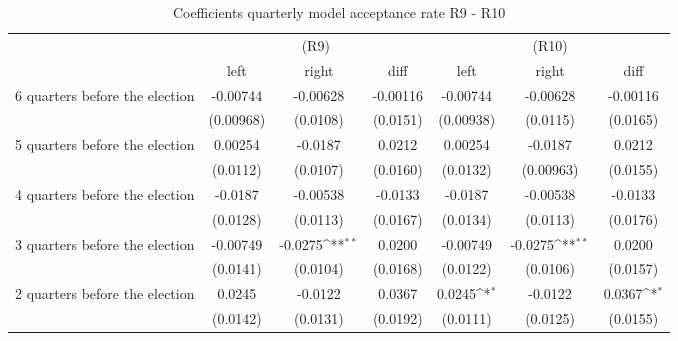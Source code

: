 \begin{table}[!ht]\centering \footnotesize
\def\sym#1{\ifmmode^{#1}\else\(^{#1}\)\fi}
\caption{Coefficients quarterly model acceptance rate R9 - R10}
\begin{tabular}{l*{6}{c}}
\hline\hline
                    &\multicolumn{3}{c}{(R9)}&\multicolumn{3}{c}{(R10)}\\
&\multicolumn{1}{c}{left}&\multicolumn{1}{c}{right}&\multicolumn{1}{c}{diff}&\multicolumn{1}{c}{left}&\multicolumn{1}{c}{right}&\multicolumn{1}{c}{diff}\\
\hline
 6 quarters before the election&    -0.00744         &    -0.00628         &    -0.00116         &    -0.00744         &    -0.00628         &    -0.00116         \\
                    &   (0.00968)         &    (0.0108)         &    (0.0151)         &   (0.00938)         &    (0.0115)         &    (0.0165)         \\
[0,5em]
 5 quarters before the election&     0.00254         &     -0.0187         &      0.0212         &     0.00254         &     -0.0187         &      0.0212         \\
                    &    (0.0112)         &    (0.0107)         &    (0.0160)         &    (0.0132)         &   (0.00963)         &    (0.0155)         \\
[0,5em]
 4 quarters before the election&     -0.0187         &    -0.00538         &     -0.0133         &     -0.0187         &    -0.00538         &     -0.0133         \\
                    &    (0.0128)         &    (0.0113)         &    (0.0167)         &    (0.0134)         &    (0.0113)         &    (0.0176)         \\
[0,5em]
 3 quarters before the election&    -0.00749         &     -0.0275\sym{**} &      0.0200         &    -0.00749         &     -0.0275\sym{**} &      0.0200         \\
                    &    (0.0141)         &    (0.0104)         &    (0.0168)         &    (0.0122)         &    (0.0106)         &    (0.0157)         \\
[0,5em]
 2 quarters before the election&      0.0245         &     -0.0122         &      0.0367         &      0.0245\sym{*}  &     -0.0122         &      0.0367\sym{*}  \\
                    &    (0.0142)         &    (0.0131)         &    (0.0192)         &    (0.0111)         &    (0.0125)         &    (0.0155)         \\

\end{tabular}
\end{table}
